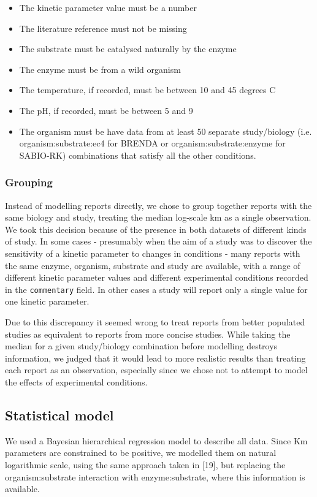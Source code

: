 \documentclass[11pt]{article}
\makeatletter
\newcommand{\citeprocitem}[2]{\hyper@linkstart{cite}{citeproc_bib_item_#1}#2\hyper@linkend}
\makeatother
\begin{document}
\begin{itemize}
\item The kinetic parameter value must be a number
\item The literature reference must not be missing
\item The substrate must be catalysed naturally by the enzyme
\item The enzyme must be from a wild organism
\item The temperature, if recorded, must be between 10 and 45 degrees C
\item The pH, if recorded, must be between 5 and 9
\item The organism must be have data from at least 50 separate study/biology
(i.e. organism:substrate:ec4 for BRENDA or organism:substrate:enzyme for
SABIO-RK) combinations that satisfy all the other conditions.
\end{itemize}

\subsubsection{Grouping}
\label{sec:org41b73d8}
Instead of modelling reports directly, we chose to group together reports with
the same biology and study, treating the median log-scale km as a single
observation. We took this decision because of the presence in both datasets of
different kinds of study. In some cases - presumably when the aim of a study was
to discover the sensitivity of a kinetic parameter to changes in conditions -
many reports with the same enzyme, organism, substrate and study are available,
with a range of different kinetic parameter values and different experimental
conditions recorded in the \texttt{commentary} field. In other cases a study will
report only a single value for one kinetic parameter.

Due to this discrepancy it seemed wrong to treat reports from better populated
studies as equivalent to reports from more concise studies. While taking the
median for a given study/biology combination before modelling destroys
information, we judged that it would lead to more realistic results than
treating each report as an observation, especially since we chose not to
attempt to model the effects of experimental conditions.

\subsection{Statistical model}
\label{sec:org5d80a30}
We used a Bayesian hierarchical regression model to describe all data. Since Km
parameters are constrained to be positive, we modelled them on natural
logarithmic scale, using the same approach taken in
\citeprocitem{19}{[19]}, but replacing the organism:substrate
interaction with enzyme:substrate, where this information is available.
\end{document}
